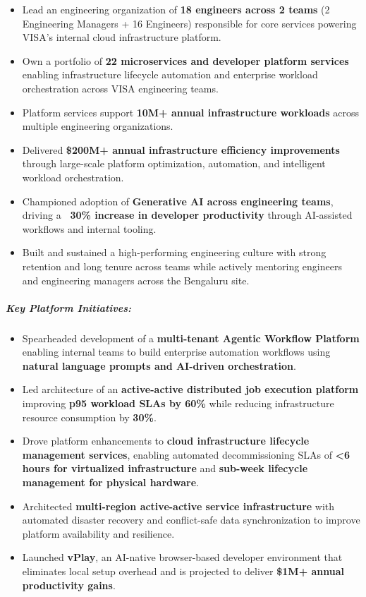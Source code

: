 \begin{itemize}
    \item Lead an engineering organization of \textbf{18 engineers across 2 teams} (2 Engineering Managers + 16 Engineers) responsible for core services powering VISA's internal cloud infrastructure platform.
    \item Own a portfolio of \textbf{22 microservices and developer platform services} enabling infrastructure lifecycle automation and enterprise workload orchestration across VISA engineering teams.
    \item Platform services support \textbf{10M+ annual infrastructure workloads} across multiple engineering organizations.
    \item Delivered \textbf{\$200M+ annual infrastructure efficiency improvements} through large-scale platform optimization, automation, and intelligent workload orchestration.
    \item Championed adoption of \textbf{Generative AI across engineering teams}, driving a \textbf{~30\% increase in developer productivity} through AI-assisted workflows and internal tooling.
    \item Built and sustained a high-performing engineering culture with strong retention and long tenure across teams while actively mentoring engineers and engineering managers across the Bengaluru site.
\end{itemize}

\subparagraph{Key Platform Initiatives:}

\begin{itemize}
    \item Spearheaded development of a \textbf{multi-tenant Agentic Workflow Platform} enabling internal teams to build enterprise automation workflows using \textbf{natural language prompts and AI-driven orchestration}.
    \item Led architecture of an \textbf{active-active distributed job execution platform} improving \textbf{p95 workload SLAs by 60\%} while reducing infrastructure resource consumption by \textbf{30\%}.
    \item Drove platform enhancements to \textbf{cloud infrastructure lifecycle management services}, enabling automated decommissioning SLAs of \textbf{<6 hours for virtualized infrastructure} and \textbf{sub-week lifecycle management for physical hardware}.
    \item Architected \textbf{multi-region active-active service infrastructure} with automated disaster recovery and conflict-safe data synchronization to improve platform availability and resilience.
    \item Launched \textbf{vPlay}, an AI-native browser-based developer environment that eliminates local setup overhead and is projected to deliver \textbf{\$1M+ annual productivity gains}.
\end{itemize}